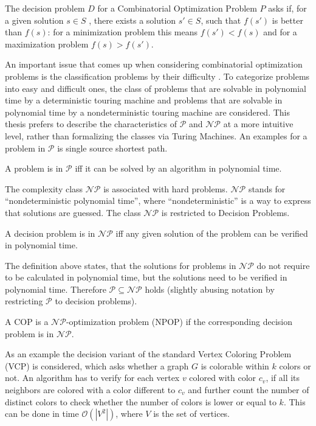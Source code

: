 \begin{definition}
The decision problem $D$ for a Combinatorial Optimization Problem $P$ asks if, for a given solution $s \in S$ , there exists a solution $s' \in S$, such that $f(s')$ is better than $f(s)$: for a minimization problem this means $f(s') < f(s)$ and for a maximization problem $f(s) > f (s')$.
\end{definition}
An important issue that comes up when considering combinatorial optimization problems is the classification problems by their difficulty . To categorize problems into easy and difficult ones, the class of problems that are solvable in polynomial time by a deterministic touring machine and problems that are solvable in polynomial time by a nondeterministic touring machine are considered. This thesis prefers to describe the characteristics of $\mathcal{P}$ and $\mathcal{NP}$ at a more intuitive level, rather than formalizing the classes via Turing Machines. An examples for a problem in $\mathcal{P}$ is single source shortest path.
\begin{definition}
A problem is in $\mathcal{P}$ iff it can be solved by an algorithm in polynomial time.
\end{definition}
The complexity class $\mathcal{NP}$ is associated with hard problems. $\mathcal{NP}$ stands for ``nondeterministic polynomial time'', where ``nondeterministic'' is a way to express that solutions are guessed. The class $\mathcal{NP}$ is restricted to Decision Problems.
\begin{definition}
A decision problem is in $\mathcal{NP}$ iff any given solution of the problem can be verified in polynomial time.
\end{definition}
The definition above states, that the solutions for problems in $\mathcal{NP}$ do not require to be calculated in polynomial time, but the solutions need to be verified in polynomial time. Therefore $\mathcal{P} \subseteq \mathcal{NP}$ holds (slightly abusing notation by restricting $\mathcal{P}$ to decision problems)\cite{neumann-10}.
\begin{definition}
A COP is a $\mathcal{NP}$-optimization problem (NPOP) if the corresponding decision problem is in $\mathcal{NP}$.
\end{definition}
As an example the decision variant of the standard Vertex Coloring Problem (VCP) is considered, which asks whether a graph $G$ is colorable within $k$ colors or not. An algorithm has to verify for each vertex $v$ colored with color $c_v$, if all its neighbors are colored with a color different to $c_v$ and further count the number of distinct colors to check whether the number of colors is lower or equal to $k$. This can be done in time  $\mathcal O(\left\vert{V^2}\right\vert)$, where $V$ is the set of vertices.\\
